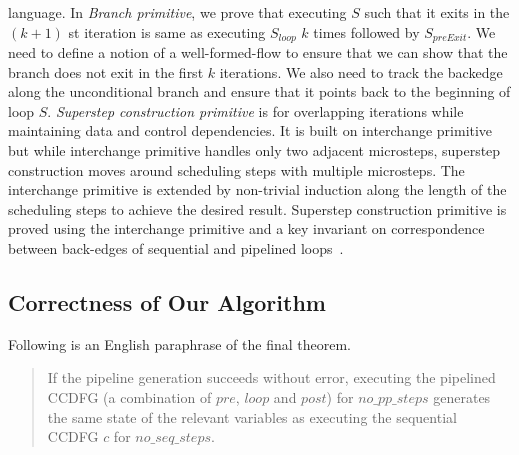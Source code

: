   language. In {\em Branch primitive}, we prove that executing $S$ such that it exits 
in the $(k+1)$ st iteration is same as executing $S_{loop}$ $k$ times followed by $S_{preExit}$. 
We need to define a notion of a well-formed-flow to ensure that we can show that the 
branch does not exit in the first $k$ iterations. We also need to track the backedge along the 
unconditional branch and ensure that it points back to the beginning of loop $S$.
 {\em Superstep construction primitive} is for overlapping iterations while 
maintaining data and control dependencies. It is built on interchange primitive but while interchange primitive
handles only two adjacent microsteps, superstep construction moves around scheduling steps with multiple microsteps. 
The interchange primitive is extended by non-trivial induction along the length of the scheduling steps to achieve the desired result. 
Superstep construction primitive is proved using the interchange primitive and a key invariant 
on correspondence between back-edges of sequential and pipelined loops~\cite{disha-itp14}. 

\subsection{Correctness of Our Algorithm}

Following is an English paraphrase of the final theorem.
  
\begin{quote}  
If the pipeline generation succeeds without error,
executing the pipelined CCDFG (a combination of $pre$, $loop$ and $post$) for $no\_pp\_steps$
generates the same state of the relevant variables as executing the sequential CCDFG $c$ for $no\_seq\_steps$.
\end{quote}

